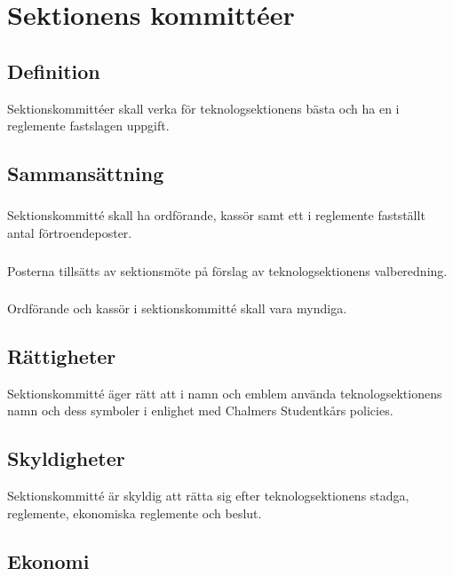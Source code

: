 \section{Sektionens kommittéer}
\subsection{Definition}

Sektionskommittéer skall verka för teknologsektionens bästa och ha
en i reglemente fastslagen uppgift.

\subsection{Sammansättning}

\subsubsection{}
Sektionskommitté skall ha ordförande, kassör samt ett i reglemente
fastställt antal förtroendeposter.

\subsubsection{}
Posterna tillsätts av sektionsmöte på förslag av teknologsektionens
valberedning.

\subsubsection{}
Ordförande och kassör i sektionskommitté skall vara myndiga.

\subsection{Rättigheter}
Sektionskommitté äger rätt att i namn och emblem använda
teknologsektionens namn och dess symboler i enlighet med Chalmers
Studentkårs policies.

\subsection{Skyldigheter}
Sektionskommitté är skyldig att rätta sig efter teknologsektionens
stadga, reglemente, ekonomiska reglemente och beslut.

\subsection{Ekonomi}

